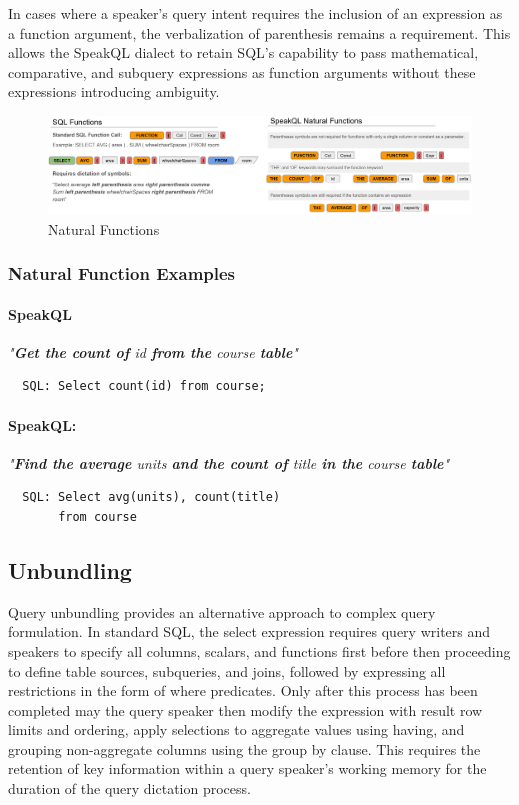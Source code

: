 In cases where a speaker's query intent requires the inclusion of an expression as a function argument, the verbalization of parenthesis remains a requirement. This allows the SpeakQL dialect to retain SQL's capability to pass mathematical, comparative, and subquery expressions as function arguments without these expressions introducing ambiguity.


\begin{figure}
  \centering
  \includegraphics[width=\textwidth]{figures/natural_functions.png}
  \caption{Natural Functions}
  \label{fig:naturalfunctions}
\end{figure}

\subsubsection{Natural Function Examples}

\paragraph{SpeakQL} \emph{"\textbf{Get the count of} id \textbf{from the} course  \textbf{table}"}
\begin{verbatim}
  SQL: Select count(id) from course;
\end{verbatim}

\paragraph{SpeakQL:} \emph{"\textbf{Find the average} units \textbf{and the count of} title \textbf{in the} course \textbf{table}"}
\begin{verbatim}
  SQL: Select avg(units), count(title)
       from course
\end{verbatim}

\subsection {Unbundling}

Query unbundling provides an alternative approach to complex query formulation. In standard SQL, the select expression requires query writers and speakers to specify all columns, scalars, and functions first before then proceeding to define table sources, subqueries, and joins, followed by expressing all restrictions in the form of where predicates. Only after this process has been completed may the query speaker then modify the expression with result row limits and ordering, apply selections to aggregate values using having, and grouping non-aggregate columns using the group by clause. This requires the retention of key information within a query speaker's working memory for the duration of the query dictation process. 

